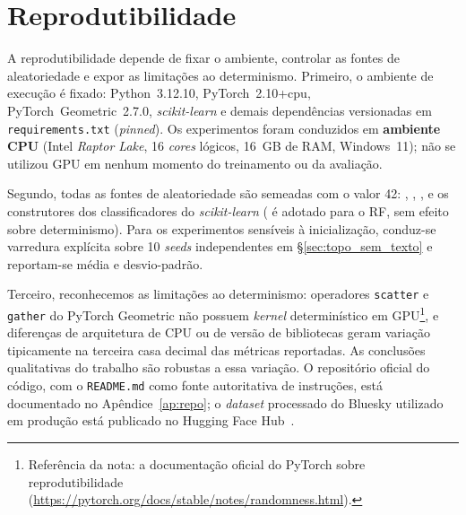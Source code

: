 \section{Reprodutibilidade}
\label{sec:reprodutibilidade}

A reprodutibilidade depende de fixar o ambiente, controlar as fontes de
aleatoriedade e expor as limita\c{c}\~oes ao determinismo. Primeiro,
o ambiente de execu\c{c}\~ao \'e fixado: Python~3.12.10, PyTorch~2.10+cpu,
PyTorch~Geometric~2.7.0, \emph{scikit-learn} e demais depend\^encias
versionadas em \texttt{requirements.txt} (\emph{pinned}). Os experimentos
foram conduzidos em \textbf{ambiente CPU} (Intel \emph{Raptor Lake}, 16
\emph{cores} l\'ogicos, 16~GB de RAM, Windows~11); n\~ao se utilizou
GPU em nenhum momento do treinamento ou da avalia\c{c}\~ao.

Segundo, todas as fontes de aleatoriedade s\~ao semeadas com o valor 42:
, ,
,  e os
construtores dos classificadores do \emph{scikit-learn} (
\'e adotado para o RF, sem efeito sobre determinismo). Para os
experimentos sens\'iveis \`a inicializa\c{c}\~ao, conduz-se varredura
expl\'icita sobre 10 \emph{seeds} independentes em \S\ref{sec:topo_sem_texto}
e reportam-se m\'edia e desvio-padr\~ao.

Terceiro, reconhecemos as limita\c{c}\~oes ao determinismo: operadores
\texttt{scatter} e \texttt{gather} do PyTorch Geometric n\~ao possuem
\emph{kernel} determin\'istico em GPU\footnote{Refer\^encia da nota: a documenta\c{c}\~ao
oficial do PyTorch sobre reprodutibilidade
(\url{https://pytorch.org/docs/stable/notes/randomness.html}).}, e
diferen\c{c}as de arquitetura de CPU ou de vers\~ao de bibliotecas
geram varia\c{c}\~ao tipicamente na terceira casa decimal das m\'etricas
reportadas. As conclus\~oes qualitativas do trabalho s\~ao robustas a
essa varia\c{c}\~ao. O reposit\'orio oficial do c\'odigo, com o
\texttt{README.md} como fonte autoritativa de instru\c{c}\~oes, est\'a
documentado no Ap\^endice~\ref{ap:repo}; o \emph{dataset} processado
do Bluesky utilizado em produ\c{c}\~ao est\'a publicado no
Hugging Face Hub~\cite{sibila2025bluesky}.